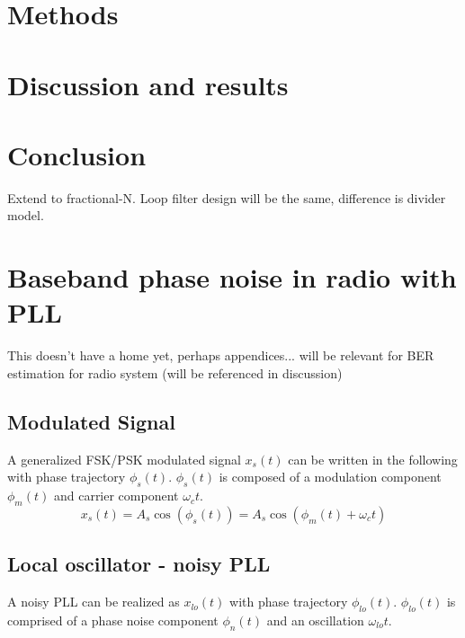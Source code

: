 	\section{Methods}\label{methods}
	

	\section{Discussion and results}\label{disco}
    

    \FloatBarrier

    \section{Conclusion} \label{conclusion}
    Extend to fractional-N. Loop filter design will be the same, difference is divider model.



	\section{Baseband phase noise in radio with PLL}
		This doesn't have a home yet, perhaps appendices... will be relevant for BER estimation for radio system (will be referenced in discussion)

	\subsection{Modulated Signal}
		A generalized FSK/PSK modulated signal $x_s(t)$ can be written in the following with phase trajectory $\phi_s(t)$. $\phi_s(t)$ is composed of a modulation component $\phi_m(t)$ and carrier component $\omega_ct$.
		\begin{equation}
			x_s(t) = A_s\cos(\phi_s(t)) = A_s\cos(\phi_m(t)+\omega_ct)
		\end{equation} 

	\subsection{Local oscillator - noisy PLL}
		A noisy PLL can be realized as $x_{lo}(t)$ with phase trajectory $\phi_{lo}(t)$. $\phi_{lo}(t)$ is comprised of a phase noise component $\phi_{n}(t)$ and an oscillation $\omega_{lo}t$. 

